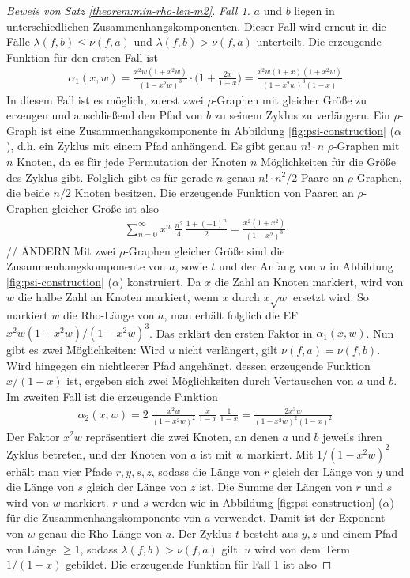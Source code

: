 \documentclass[a4paper, 11pt, ngerman]{article}
\begin{document}
\begin{proof}[Beweis von Satz \ref{theorem:min-rho-len-m2}]
    \emph{Fall 1.} $a$ und $b$ liegen in unterschiedlichen Zusammenhangskomponenten. Dieser Fall wird erneut in die Fälle $\lambda(f, b) \le \nu(f, a)$ und $\lambda(f, b) > \nu(f, a)$ unterteilt. Die erzeugende Funktion für den ersten Fall ist
    \begin{align*}
        \alpha_1(x, w) = \frac {x^2w(1 + x^2w)} {(1 - x^2w)^3} \cdot \Bigg (1 + \frac {2x} {1 - x} \Bigg ) = \frac {x^2w(1 + x)(1 + x^2w)} {(1 - x^2w)^3(1 - x)}
    \end{align*}
    In diesem Fall ist es möglich, zuerst zwei $\rho$-Graphen mit gleicher Größe zu erzeugen und anschließend den Pfad von $b$ zu seinem Zyklus zu verlängern. Ein $\rho$-Graph ist eine Zusammenhangskomponente in Abbildung \ref{fig:psi-construction} ($\alpha$), d.h. ein Zyklus mit einem Pfad anhängend. Es gibt genau $n! \cdot n$ $\rho$-Graphen mit $n$ Knoten, da es für jede Permutation der Knoten $n$ Möglichkeiten für die Größe des Zyklus gibt. Folglich gibt es für gerade $n$ genau $n! \cdot n^2/2$ Paare an $\rho$-Graphen, die beide $n/2$ Knoten besitzen. Die erzeugende Funktion von Paaren an $\rho$-Graphen gleicher Größe ist also
    \begin{align*}
        \sum_{n = 0}^\infty x^n \; \frac {n^2} 4 \, \frac {1 + (-1)^n} 2
        = \frac {x^2(1 + x^2)} {(1 - x^2)^3}
    \end{align*}
    // ÄNDERN
    Mit zwei $\rho$-Graphen gleicher Größe sind die Zusammenhangskomponente von $a$, sowie $t$ und der Anfang von $u$ in Abbildung \ref{fig:psi-construction} ($\alpha$) konstruiert. Da $x$ die Zahl an Knoten markiert, wird von $w$ die halbe Zahl an Knoten markiert, wenn $x$ durch $x \sqrt w$ ersetzt wird. So markiert $w$ die Rho-Länge von $a$, man erhält folglich die EF $x^2w(1 + x^2w) / (1 - x^2w)^3$. Das erklärt den ersten Faktor in $\alpha_1(x, w)$. Nun gibt es zwei Möglichkeiten: Wird $u$ nicht verlängert, gilt $\nu(f, a) = \nu(f, b)$. Wird hingegen ein nichtleerer Pfad angehängt, dessen erzeugende Funktion $x/(1 - x)$ ist, ergeben sich zwei Möglichkeiten durch Vertauschen von $a$ und $b$. Im zweiten Fall ist die erzeugende Funktion
    \begin{align*}
        \alpha_2(x, w) =
        2 \; \frac {x^2w} {(1 - x^2w)^2} \, \frac x {1 - x} \,
        \frac {1}{1 - x}
        = \frac {2x^3w} {(1 - x^2w)^2 (1 - x)^2}
    \end{align*}
    Der Faktor $x^2w$ repräsentiert die zwei Knoten, an denen $a$ und $b$ jeweils ihren Zyklus betreten, und der Knoten von $a$ ist mit $w$ markiert. Mit $1 / (1 - x^2w)^2$ erhält man vier Pfade $r, y, s, z$, sodass die Länge von $r$ gleich der Länge von $y$ und die Länge von $s$ gleich der Länge von $z$ ist. Die Summe der Längen von $r$ und $s$ wird von $w$ markiert. $r$ und $s$ werden wie in Abbildung \ref{fig:psi-construction} ($\alpha$) für die Zusammenhangskomponente von $a$ verwendet. Damit ist der Exponent von $w$ genau die Rho-Länge von $a$. Der Zyklus $t$ besteht aus $y, z$ und einem Pfad von Länge $\ge 1$, sodass $\lambda(f, b) > \nu(f, a)$ gilt. $u$ wird von dem Term $1 / (1 - x)$ gebildet. Die erzeugende Funktion für Fall 1 ist also

\end{proof}
\end{document}
